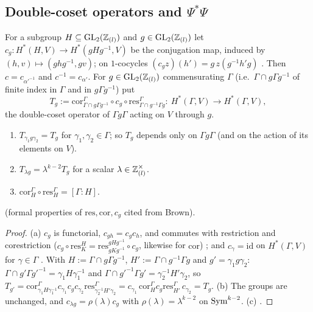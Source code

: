 \subsection*{Double-coset operators and \texorpdfstring{$\Psi^*\Psi$}{Psi*Psi}}
For a subgroup $H\subseteq\mathrm{GL}_2(\mathbb{Z}_{(l)})$ and $g\in\mathrm{GL}_2(\mathbb{Z}_{(l)})$ let $c_g:H^*(H,V)\to H^*(gHg^{-1},V)$ be the conjugation map, induced by
$(h,v)\mapsto(ghg^{-1},gv)$; on $1$-cocycles $(c_gz)(h')=g\,z(g^{-1}h'g)$
. Then $c=c_{\alpha'^{-1}}$ and $c^{-1}=c_{\alpha'}$. For $g\in\mathrm{GL}_2(\mathbb{Z}_{(l)})$ commensurating $\Gamma$ (i.e.\ $\Gamma\cap g\Gamma g^{-1}$ of finite index in $\Gamma$ and in $g\Gamma g^{-1}$) put
\[T_g:=\mathrm{cor}^{\Gamma}_{\Gamma\cap g\Gamma g^{-1}}\circ c_g\circ\mathrm{res}^{\Gamma}_{\Gamma\cap g^{-1}\Gamma g}:\ H^*(\Gamma,V)\to H^*(\Gamma,V),\]
the double-coset operator of $\Gamma g\Gamma$ acting on $V$ through $g$.

\begin{lemma}\label{lem:s03-dcoset}\leavevmode
\begin{enumerate}[label=(\alph*)]
\item $T_{\gamma_1g\gamma_2}=T_g$ for $\gamma_1,\gamma_2\in\Gamma$; so $T_g$ depends only on $\Gamma g\Gamma$ (and on the action of its elements on $V$).
\item $T_{\lambda g}=\lambda^{k-2}T_g$ for a scalar $\lambda\in\mathbb{Z}_{(l)}^\times$.
\item $\mathrm{cor}^\Gamma_H\circ\mathrm{res}^\Gamma_H=[\Gamma:H]$.
\end{enumerate}
\stpmc{} (formal properties of $\mathrm{res},\mathrm{cor},c_g$ cited from Brown).
\end{lemma}
\begin{proof}
(a) $c_{g}$ is functorial, $c_{gh}=c_gc_h$, and commutes with restriction and corestriction ($c_g\circ\mathrm{res}^H_K=\mathrm{res}^{gHg^{-1}}_{gKg^{-1}}\circ c_g$,
likewise for $\mathrm{cor}$) ; and $c_\gamma=\mathrm{id}$ on $H^*(\Gamma,V)$ for $\gamma\in\Gamma$
. With $H:=\Gamma\cap g\Gamma g^{-1}$, $H':=\Gamma\cap g^{-1}\Gamma g$ and $g'=\gamma_1g\gamma_2$:
$\Gamma\cap g'\Gamma g'^{-1}=\gamma_1H\gamma_1^{-1}$ and $\Gamma\cap g'^{-1}\Gamma g'=\gamma_2^{-1}H'\gamma_2$, so
$T_{g'}=\mathrm{cor}^\Gamma_{\gamma_1H\gamma_1^{-1}}c_{\gamma_1}c_gc_{\gamma_2}\mathrm{res}^\Gamma_{\gamma_2^{-1}H'\gamma_2}=c_{\gamma_1}\,\mathrm{cor}^\Gamma_Hc_g\mathrm{res}^\Gamma_{H'}\,c_{\gamma_2}=T_g$.
(b) The groups are unchanged, and $c_{\lambda g}=\rho(\lambda)c_g$ with $\rho(\lambda)=\lambda^{k-2}$ on $\mathrm{Sym}^{k-2}$. (c) .
\end{proof}

